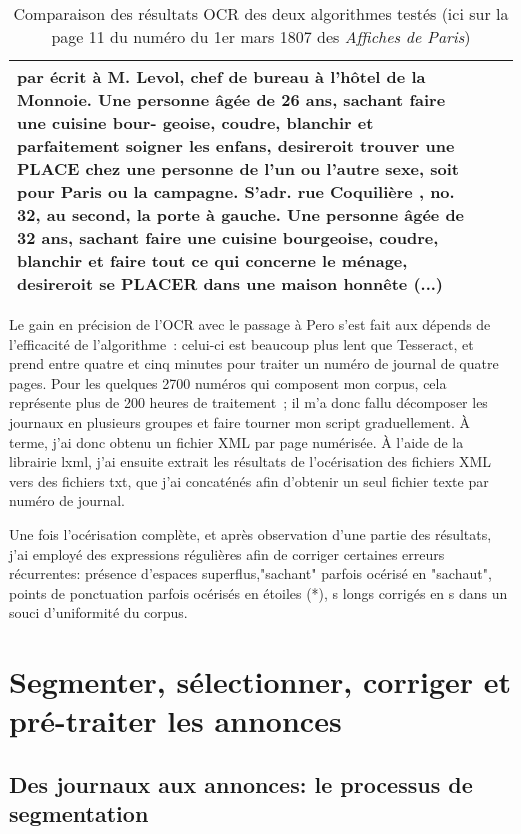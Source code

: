 \begin{table}[!htbp]
\begin{tabularx}{\textwidth}{|X|X|X|}
par écrit à M. Levol, chef de bureau à l'hôtel de la Monnoie. Une personne âgée de 26 ans, sachant faire une cuisine bour- geoise, coudre, blanchir et parfaitement soigner les enfans, desireroit trouver une PLACE chez une personne de l'un ou l'autre sexe, soit pour Paris ou la campagne. S'adr. rue Coquilière , no. 32, au second, la porte à gauche. Une personne âgée de 32 ans, sachant faire une cuisine bourgeoise, coudre, blanchir et faire tout ce qui concerne le ménage, desireroit se PLACER dans une maison honnête (...) \\ 
		\bottomrule
	\end{tabularx}
	\caption{Comparaison des résultats OCR des deux algorithmes testés (ici sur la page 11 du numéro du 1er mars 1807 des \textit{Affiches de Paris})}
\end{table}%

Le gain en précision de l’OCR avec le passage à Pero s’est fait aux dépends de l’efficacité de l’algorithme : celui-ci est beaucoup plus lent que Tesseract, et prend entre quatre et cinq minutes pour traiter un numéro de journal de quatre pages. Pour les quelques 2700 numéros qui composent mon corpus, cela représente plus de 200 heures de traitement ; il m’a donc fallu décomposer les journaux en plusieurs groupes et faire tourner mon script graduellement. À terme, j’ai donc obtenu un fichier XML par page numérisée. À l’aide de la librairie lxml, j’ai ensuite extrait les résultats de l’océrisation des fichiers XML vers des fichiers txt, que j’ai concaténés afin d’obtenir un seul fichier texte par numéro de journal. 

Une fois l'océrisation complète, et après observation d'une partie des résultats, j'ai employé des expressions régulières afin de corriger certaines erreurs récurrentes: présence d'espaces superflus,"sachant" parfois océrisé en "sachaut", points de ponctuation parfois océrisés en étoiles (*),  s longs corrigés en s dans un souci d'uniformité du corpus.


\chapter{Segmenter, sélectionner, corriger et pré-traiter les annonces}

\section{Des journaux aux annonces: le processus de segmentation}

